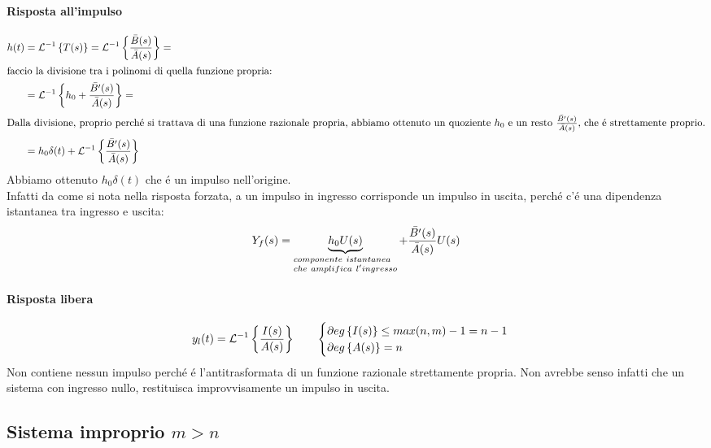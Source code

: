 \documentclass[../main.tex]{subfiles}
\begin{document}
	\paragraph{Risposta all'impulso}
	\begin{align*}
	h(t) &= \mathcal{L}^{-1} \left\lbrace T(s) \right\rbrace = \mathcal{L}^{-1} \left\lbrace \frac{\bar{B}(s)}{\bar{A}(s)} \right\rbrace =\\
	\intertext{faccio la divisione tra i polinomi di quella funzione propria:}
	&= \mathcal{L}^{-1} \left\lbrace h_0 + \frac{\bar{B'}(s)}{\bar{A}(s)} \right\rbrace =\\
	\intertext{Dalla divisione, proprio perch\'{e} si trattava di una funzione razionale propria, abbiamo ottenuto un quoziente $ h_0 $ e un resto $ \frac{\bar{B'}(s)}{\bar{A}(s)} $, che \'{e} strettamente proprio.}
	&= h_0 \delta(t) + \mathcal{L}^{-1} \left\lbrace \frac{\bar{B'}(s)}{\bar{A}(s)} \right\rbrace
	\end{align*}
	Abbiamo ottenuto $ h_0 \delta(t) $ che \'{e} un impulso nell'origine.\\
	Infatti da come si nota nella risposta forzata, a un impulso in ingresso corrisponde un impulso in uscita, perch\'{e} c'\'{e} una dipendenza istantanea tra ingresso e uscita:
	\[ Y_f(s) = \underbrace{h_0 U(s)}_{\begin{subarray}{l} componente\ istantanea \\ che\ amplifica\ l'ingresso \end{subarray}} + \frac{\bar{B'}(s)}{\bar{A}(s)} U(s) \]
	\paragraph{Risposta libera}
	\[ y_l(t) = \mathcal{L}^{-1} \left\lbrace \frac{I(s)}{A(s)} \right\rbrace \qquad \begin{cases} \partial eg \left\lbrace I(s) \right\rbrace \leq max(n,m)-1 = n-1\\ \partial eg \left\lbrace A(s) \right\rbrace=n \end{cases}\]
	Non contiene nessun impulso perch\'{e} \'{e} l'antitrasformata di un funzione razionale strettamente propria. Non avrebbe senso infatti che un sistema con ingresso nullo, restituisca improvvisamente un impulso in uscita.
	\subsection{Sistema improprio $ m > n $}
\end{document}
